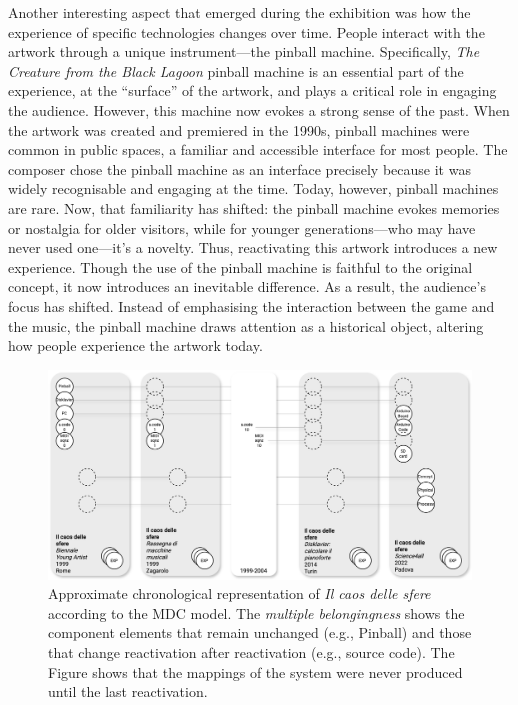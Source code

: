 Another interesting aspect that emerged during the exhibition was how the experience of specific technologies changes over time. People interact with the artwork through a unique instrument—the pinball machine. Specifically, \textit{The Creature from the Black Lagoon} pinball machine is an essential part of the experience, at the ``surface'' of the artwork, and plays a critical role in engaging the audience. However, this machine now evokes a strong sense of the past. When the artwork was created and premiered in the 1990s, pinball machines were common in public spaces, a familiar and accessible interface for most people. The composer chose the pinball machine as an interface precisely because it was widely recognisable and engaging at the time. Today, however, pinball machines are rare. Now, that familiarity has shifted: the pinball machine evokes memories or nostalgia for older visitors, while for younger generations—who may have never used one—it’s a novelty. Thus, reactivating this artwork introduces a new experience. Though the use of the pinball machine is faithful to the original concept, it now introduces an inevitable difference. As a result, the audience's focus has shifted. Instead of emphasising the interaction between the game and the music, the pinball machine draws attention as a historical object, altering how people experience the artwork today.\\

\begin{figure}[!h]
    \includegraphics[width=\linewidth]{chapters/appendix/b/image/graphb-mdc.png}
    \caption{Approximate chronological representation of \textit{Il caos delle sfere} according to the MDC model. The \textit{multiple belongingness} shows the component elements that remain unchanged (e.g., Pinball) and those that change reactivation after reactivation (e.g., source code). The Figure shows that the mappings of the system were never produced until the last reactivation.}
    \label{fig:ab-graph_mdc}
\end{figure}

